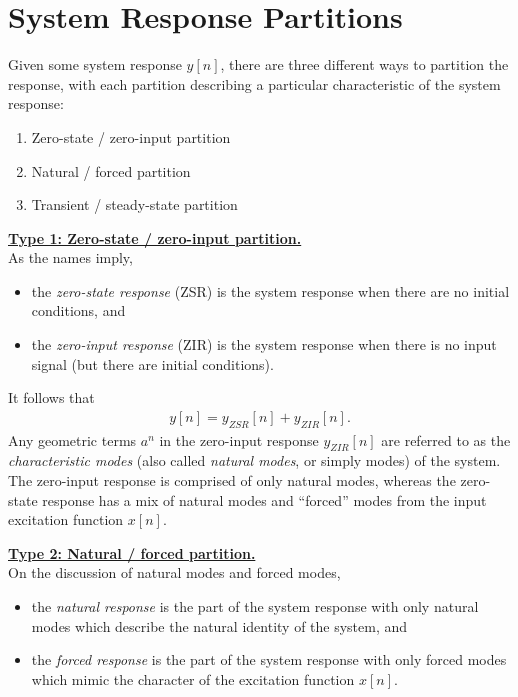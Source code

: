 \documentclass{report}
\begin{document}
\section{System Response Partitions}
Given some system response $y[n]$, there are three different ways to partition the response, with each partition describing a particular 
characteristic of the system response:
\begin{enumerate}
    \item Zero-state / zero-input partition
    \item Natural / forced partition
    \item Transient / steady-state partition
\end{enumerate}
\begin{tcolorbox}[width=\textwidth,colback={white}, sharp corners]
    \textbf{\underline{Type 1: Zero-state / zero-input partition.}} \\[0.25cm]
    As the names imply,
    \begin{itemize}
        \item the \emph{zero-state response} (ZSR) is the system response when there are no initial conditions, and
        \item the \emph{zero-input response} (ZIR) is the system response when there is no input signal (but there are initial conditions).
    \end{itemize}
\end{tcolorbox}
It follows that 
\begin{align}
    y[n] = y_{ZSR}[n] + y_{ZIR}[n].
\end{align}
Any geometric terms $a^n$ in the zero-input response $y_{ZIR}[n]$ are referred to as the \emph{characteristic modes} (also called \emph{natural modes}, or simply modes) 
of the system. The zero-input response is comprised of only natural modes, whereas the zero-state response has a mix of natural modes and ``forced'' modes from the input excitation function $x[n]$.
\begin{tcolorbox}[width=\textwidth,colback={white}, sharp corners]
    \textbf{\underline{Type 2: Natural / forced partition.}} \\[0.25cm]
    On the discussion of natural modes and forced modes,
    \begin{itemize}
        \item the \emph{natural response} is the part of the system response with only natural modes which describe the natural identity of the system, and
        \item the \emph{forced response} is the part of the system response with only forced modes which mimic the character of the excitation function $x[n]$.
    \end{itemize}
\end{tcolorbox}
\end{document}
